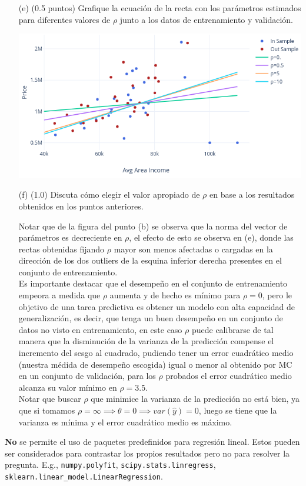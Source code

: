 \documentclass[11pt,letterpaper]{article}
\begin{document}
\begin{itemize}
	\item[(e)] (0.5 puntos) Grafique la ecuación de la recta con los parámetros estimados para diferentes valores de $\rho$ junto a los datos de entrenamiento y validación.\\
	
	\begin{minipage}{\linewidth}
    \centering
    \includegraphics[width=\textwidth]{img/lines.png}
    \end{minipage}	
	
	\item[(f)] (1.0) Discuta cómo elegir  el valor apropiado de $\rho$ en base a los resultados obtenidos en los puntos anteriores.
	
Notar que de la figura del punto (b) se observa que la norma del vector de parámetros es decreciente en $\rho$, el efecto de esto se observa en (e), donde las rectas obtenidas fijando $\rho$ mayor son menos afectadas o cargadas en la dirección de los dos outliers de la esquina inferior derecha presentes en el conjunto de entrenamiento. \\

Es importante destacar que el desempeño en el conjunto de entrenamiento empeora a medida que $\rho$ aumenta y de hecho es mínimo para $\rho=0$, pero le objetivo de una tarea predictiva es obtener un modelo con alta capacidad de generalización, es decir, que tenga un buen desempeño en un conjunto de datos no visto en entrenamiento, en este caso $\rho$ puede calibrarse de tal manera que la disminución de la varianza de la predicción compense el incremento del sesgo al cuadrado, pudiendo tener un error cuadrático medio (nuestra médida de desempeño escogida) igual o menor al obtenido por MC en un conjunto de validación, para los $\rho$ probados el error cuadrático medio alcanza su valor mínimo en $\rho=3.5$. \\

Notar que buscar $\rho$ que minimice la varianza de la predicción no está bien, ya que si tomamos $\rho=\infty \implies \theta=0 \implies var(\hat{y})=0$, luego se tiene que la varianza es mínima y el error cuadrático medio es máximo.

\end{itemize}

 \textbf{No} se permite el uso de paquetes predefinidos para regresión lineal. Estos pueden ser considerados para contrastar los propios resultados pero no para resolver la pregunta. E.g., \texttt{numpy.polyfit},  \texttt{scipy.stats.linregress}, \texttt{sklearn.linear\_model.LinearRegression}.
\end{document}
